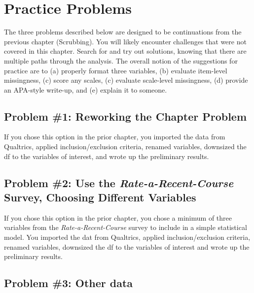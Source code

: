 \documentclass[
  11pt,
]{book}
\begin{document}
\hypertarget{practice-problems-1}{%
\section{Practice Problems}\label{practice-problems-1}}

The three problems described below are designed to be continuations from the previous chapter (Scrubbing). You will likely encounter challenges that were not covered in this chapter. Search for and try out solutions, knowing that there are multiple paths through the analysis. The overall notion of the suggestions for practice are to (a) properly format three variables, (b) evaluate item-level missingness, (c) score any scales, (c) evaluate scale-level missingness, (d) provide an APA-style write-up, and (e) explain it to someone.

\hypertarget{problem-1-reworking-the-chapter-problem}{%
\subsection{Problem \#1: Reworking the Chapter Problem}\label{problem-1-reworking-the-chapter-problem}}

If you chose this option in the prior chapter, you imported the data from Qualtrics, applied inclusion/exclusion criteria, renamed variables, downsized the df to the variables of interest, and wrote up the preliminary results.

\hypertarget{problem-2-use-the-rate-a-recent-course-survey-choosing-different-variables-1}{%
\subsection{\texorpdfstring{Problem \#2: Use the \emph{Rate-a-Recent-Course} Survey, Choosing Different Variables}{Problem \#2: Use the Rate-a-Recent-Course Survey, Choosing Different Variables}}\label{problem-2-use-the-rate-a-recent-course-survey-choosing-different-variables-1}}

If you chose this option in the prior chapter, you chose a minimum of three variables from the \emph{Rate-a-Recent-Course} survey to include in a simple statistical model. You imported the dat from Qualtrics, applied inclusion/exclusion criteria, renamed variables, downsized the df to the variables of interest and wrote up the preliminary results.

\hypertarget{problem-3-other-data-1}{%
\subsection{Problem \#3: Other data}\label{problem-3-other-data-1}}
\end{document}
